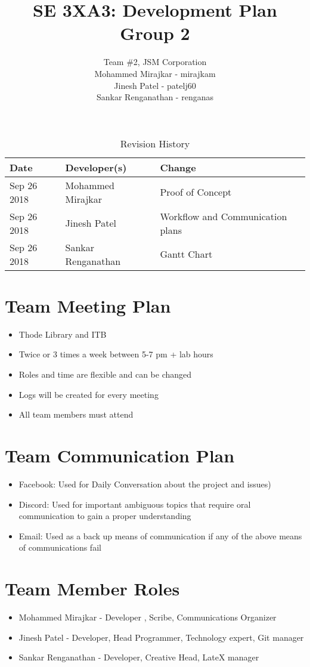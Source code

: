 \documentclass{article}
\title{SE 3XA3: Development Plan \\ Group 2}
\author{Team \#2, JSM Corporation
		\\ Mohammed Mirajkar - mirajkam
		\\ Jinesh Patel - patelj60
		\\ Sankar Renganathan - renganas
}
\date{}
\begin{document}
\begin{table}[hp]
\caption{Revision History} \label{TblRevisionHistory}
\begin{tabularx}{\textwidth}{llX}
\toprule
\textbf{Date} & \textbf{Developer(s)} & \textbf{Change}\\
\midrule
Sep 26 2018 & Mohammed Mirajkar & Proof of Concept\\
Sep 26 2018 & Jinesh Patel & Workflow and Communication plans\\
Sep 26 2018 & Sankar Renganathan & Gantt Chart\\
\bottomrule
\end{tabularx}
\end{table}

\newpage

\maketitle


\section*{Team Meeting Plan}
\begin{itemize}
  \item Thode Library and ITB
  \item Twice or 3 times a week between 5-7 pm + lab hours
  \item Roles and time are flexible and can be changed
  \item Logs will be created for every meeting
  \item All team members must attend

\end{itemize}

\section*{Team Communication Plan}
 \begin{itemize}
      	\item Facebook: Used for Daily Conversation about the project and issues)
	\item Discord: Used for important ambiguous topics that require oral communication to gain a proper understanding
	\item Email: Used as a back up means of communication if any of the above means of communications fail
\end{itemize}

\section*{Team Member Roles}
  \begin{itemize}
      \item Mohammed Mirajkar - Developer , Scribe, Communications Organizer
      \item Jinesh Patel - Developer, Head Programmer, Technology expert, Git manager
      \item Sankar Renganathan - Developer, Creative Head, LateX manager
  \end{itemize}
\end{document}
